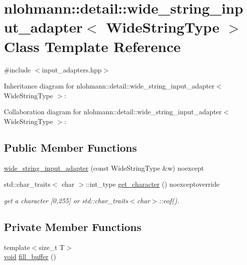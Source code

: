 \hypertarget{classnlohmann_1_1detail_1_1wide__string__input__adapter}{}\section{nlohmann\+:\+:detail\+:\+:wide\+\_\+string\+\_\+input\+\_\+adapter$<$ Wide\+String\+Type $>$ Class Template Reference}
\label{classnlohmann_1_1detail_1_1wide__string__input__adapter}


{\ttfamily \#include $<$input\+\_\+adapters.\+hpp$>$}



Inheritance diagram for nlohmann\+:\+:detail\+:\+:wide\+\_\+string\+\_\+input\+\_\+adapter$<$ Wide\+String\+Type $>$\+:


Collaboration diagram for nlohmann\+:\+:detail\+:\+:wide\+\_\+string\+\_\+input\+\_\+adapter$<$ Wide\+String\+Type $>$\+:
\subsection*{Public Member Functions}
\begin{DoxyCompactItemize}
\item 
\hyperlink{classnlohmann_1_1detail_1_1wide__string__input__adapter_a85c8bddae20bc00d64dd7a2c87109357}{wide\+\_\+string\+\_\+input\+\_\+adapter} (const Wide\+String\+Type \&w) noexcept
\item 
std\+::char\+\_\+traits$<$ char $>$\+::int\+\_\+type \hyperlink{classnlohmann_1_1detail_1_1wide__string__input__adapter_a337a9052b18a9dcda49a36fcc9c3d083}{get\+\_\+character} () noexceptoverride
\begin{DoxyCompactList}\small\item\em get a character \mbox{[}0,255\mbox{]} or std\+::char\+\_\+traits$<$char$>$\+::eof(). \end{DoxyCompactList}\end{DoxyCompactItemize}
\subsection*{Private Member Functions}
\begin{DoxyCompactItemize}
\item 
{\footnotesize template$<$size\+\_\+t T$>$ }\\\hyperlink{namespacenlohmann_1_1detail_a59fca69799f6b9e366710cb9043aa77d}{void} \hyperlink{classnlohmann_1_1detail_1_1wide__string__input__adapter_ab718e44c524fa7ec74b0a0ae1ad64ca4}{fill\+\_\+buffer} ()
\end{DoxyCompactItemize}
